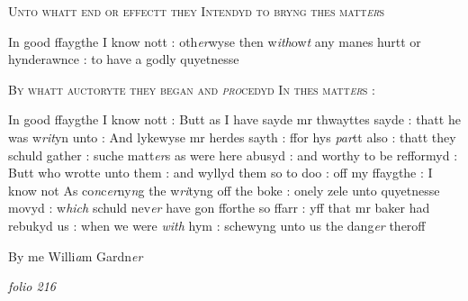\documentclass[12pt, a4paper]{book}
\begin{document}
				\begin{center} \begin{large} {\scshape Unto whatt end or effectt they
		Intendyd to bryng thes matt\textit{er}s} \end{large} \end{center}
			
	
		
		\ifthenelse{\isodd{\thepage}}
		{\reversemarginpar}
		{\normalmarginpar}
		In good ffaygthe I know nott : oth\textit{er}wyse then w\textit{ith}ow\textit{t} any manes hurtt
or hynderawnce : to have a godly quyetnesse
	
				
				\begin{center} \begin{large} {\scshape By whatt auctoryte they began
		and \textit{pro}cedyd In thes matt\textit{er}s :} \end{large} \end{center}
			
 	
				\marginpar[\vspace{0.5cm}{\textcolor{Gray}{Twaith hardes}}]{}
			
	
		\ifthenelse{\isodd{\thepage}}
		{\reversemarginpar}
		{\normalmarginpar}
		In good ffaygthe I know nott : Butt as I have sayde mr thwayttes
sayde : thatt he was w\textit{rit}yn unto : And lykewyse mr herdes sayth : ffor
hys \textit{par}tt also : thatt they schuld gather : suche matt\textit{er}s as were
here abusyd : and worthy to be refformyd : Butt who wrotte unto
them : and wyllyd them so to doo : off my ffaygthe : I know not
As co\textit{n}c\textit{er}ny\textit{n}g the w\textit{ri}tyng off the boke : onely zele unto quyetnesse movyd :
w\textit{hich} schuld nev\textit{er} have gon fforthe so ffarr : yff that mr baker had 
rebukyd us : when we were \textit{with} hym : schewyng unto us the dang\textit{er }theroff

		\ifthenelse{\isodd{\thepage}}
		{\reversemarginpar}
		{\normalmarginpar}
		By me Willi\textit{a}m Gardn\textit{er}

               
\dotfill
						\newpage
{}

\textit{folio 216}


         \vspace*{4cm}
         
\dotfill
						  \section*{}  \subsection*{}
\end{document}
